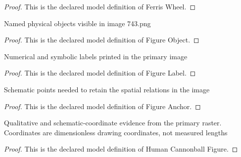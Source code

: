 \begin{proof}
  This is the declared model definition of Ferris Wheel.
\end{proof}
\begin{definition}
  \label{def:physics:phyx-mini-0743:phyxminiproblems-problemphyxmini0743-figureobject}
  Named physical objects visible in image 743.png
\end{definition}
\begin{proof}
  This is the declared model definition of Figure Object.
\end{proof}
\begin{definition}
  \label{def:physics:phyx-mini-0743:phyxminiproblems-problemphyxmini0743-figurelabel}
  Numerical and symbolic labels printed in the primary image
\end{definition}
\begin{proof}
  This is the declared model definition of Figure Label.
\end{proof}
\begin{definition}
  \label{def:physics:phyx-mini-0743:phyxminiproblems-problemphyxmini0743-figureanchor}
  Schematic points needed to retain the spatial relations in the image
\end{definition}
\begin{proof}
  This is the declared model definition of Figure Anchor.
\end{proof}
\begin{definition}
  \label{def:physics:phyx-mini-0743:phyxminiproblems-problemphyxmini0743-humancannonballfigure}
  Qualitative and schematic-coordinate evidence from the primary raster. Coordinates are dimensionless drawing coordinates, not measured lengths
\end{definition}
\begin{proof}
  This is the declared model definition of Human Cannonball Figure.
\end{proof}
